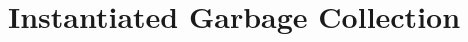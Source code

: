 \documentclass{article}
\numberwithin{equation}{section}
\renewcommand{\tt}[1]{\ifmmode\text{\texttt{#1}}\else\texttt{#1}\fi}
\begin{document}







\section{Instantiated Garbage Collection}
\label{sec:instantiated}
\end{document}
